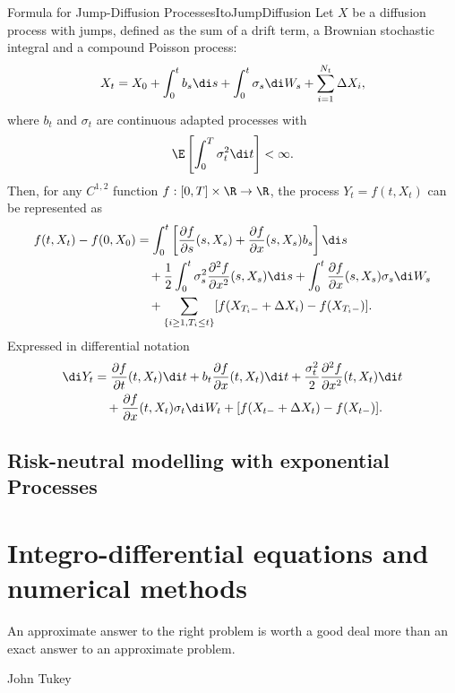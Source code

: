 \begin{prop}{\Ito{} Formula for Jump-Diffusion Processes}{ItoJumpDiffusion}
	Let $X$ be a diffusion process with jumps, defined as the sum of a drift term, a Brownian stochastic integral and a compound Poisson process:
	\begin{equation*}
		X_t = X_0 + \int_0^t b_s \di s + \int_0^t \sigma_s \di W_s + \sum_{i=1}^{N_t} \Delta X_i,
	\end{equation*}
	where $b_t$ and $\sigma_t$ are continuous adapted processes with
	\begin{equation*}
		\E\left[ \int_0^T \sigma_t^2 \di t \right] < \infty.
	\end{equation*}
	Then, for any $C^{1,2}$ function $f : [0,T] \times \R \to \R$, the process $Y_t = f(t, X_t)$ can be represented as
	\begin{align*}
		f(t, X_t) - f(0, X_0) & = \int_0^t \left[ \frac{\partial f}{\partial s}(s, X_s) + \frac{\partial f}{\partial x}(s, X_s)b_s \right] \di s                                        \\
		                      & \quad + \frac{1}{2} \int_0^t \sigma_s^2 \frac{\partial^2 f}{\partial x^2}(s, X_s)\di s + \int_0^t \frac{\partial f}{\partial x}(s, X_s)\sigma_s \di W_s \\
		                      & \quad + \sum_{\{i \ge 1, T_i \le t\}} [f(X_{T_i-} + \Delta X_i) - f(X_{T_i-})].
	\end{align*}
	Expressed in differential notation
	\begin{align*}
		\di Y_t & = \frac{\partial f}{\partial t}(t, X_t) \di t + b_t \frac{\partial f}{\partial x}(t, X_t) \di t + \frac{\sigma_t^2}{2} \frac{\partial^2 f}{\partial x^2}(t, X_t) \di t \\
		        & \quad + \frac{\partial f}{\partial x}(t, X_t) \sigma_t \di W_t + [f(X_{t-} + \Delta X_t) - f(X_{t-})].
	\end{align*}
\end{prop}

\subsection{Risk-neutral modelling with exponential \Levy{} Processes}

\section{Integro-differential equations and numerical methods}
\epigraph{An approximate answer to the right problem is worth a good deal more than an exact answer to an approximate problem.}{John Tukey}

